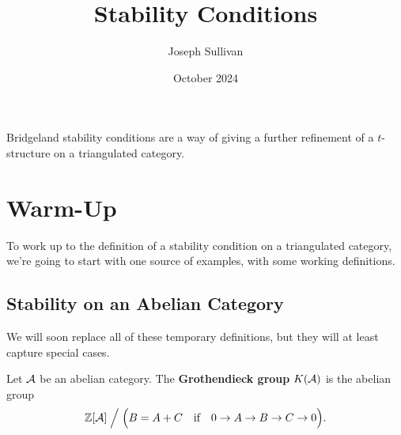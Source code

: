 \documentclass[12pt]{article}
\title{Stability Conditions}
\author{Joseph Sullivan}
\date{October 2024}
\begin{document}
\maketitle
\tableofcontents

Bridgeland stability conditions are a way of giving a further refinement of a $t$-structure on a triangulated category.

\section{Warm-Up}

To work up to the definition of a stability condition on a triangulated category, we're going to start with one source of examples, with some working definitions.

\subsection{Stability on an Abelian Category}

We will soon replace all of these temporary definitions, but they will at least capture special cases.

\begin{defn}
    Let $\mathcal{A}$ be an abelian category. The \textbf{Grothendieck group} $K(\mathcal{A})$ is the abelian group
    \[\mathbb{Z}[\mathcal{A}]\;\Big/\;\Big(B=A+C \quad \text{if} \quad 0\to A \to B \to C \to 0\Big).\]
\end{defn}
\end{document}
